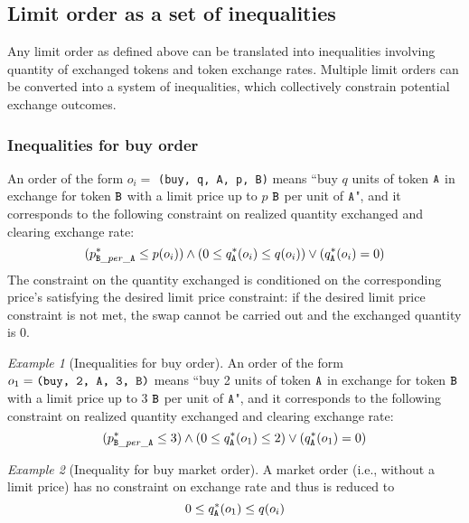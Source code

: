 \documentclass[11pt, reqno]{amsart}
\theoremstyle{definition}
\theoremstyle{remark}
\newtheorem{exmp}{Example}[subsection]
\newcommand{\tA}{\textnormal{\texttt{A}}}
\newcommand{\tB}{\textnormal{\texttt{B}}}
\newcommand{\buy}{\textnormal{\texttt{buy}}}
\begin{document}
\subsection{Limit order as a set of inequalities}
Any limit order as defined above can be translated into inequalities involving
quantity of exchanged tokens and token exchange rates. Multiple limit orders
can be converted into a system of inequalities, which collectively constrain
potential exchange outcomes.

\subsubsection{Inequalities for buy order}
An order of the form $o_i =$ \texttt{(\buy, q, \tA, p, \tB)} means
``buy $q$ units of token $\tA$ in exchange for token $\tB$ with a limit price
up to $p$ $\tB$ per unit of $\tA$",
and it corresponds to the following constraint on realized quantity exchanged
and clearing exchange rate:
\begin{equation*}
	(p_{\tB\_per\_\tA}^* \leq p(o_i)) \land
	(0 \le q_\tA^*(o_i) \leq q(o_i)) \lor
	(q_\tA^*(o_i) = 0)
\end{equation*}
The constraint on the quantity exchanged is conditioned on the corresponding
price's satisfying the desired limit price constraint: if the desired limit price
constraint is not met, the swap cannot be carried out and the exchanged quantity
is 0.

\begin{exmp}[Inequalities for buy order]
An order of the form $o_1 = \texttt{(\buy, 2, \tA, 3, \tB)}$ means
``buy 2 units of token $\tA$ in exchange for token $\tB$ with a limit price up
to 3 $\tB$ per unit of $\tA$",
and it corresponds to the following constraint on realized quantity exchanged
and clearing exchange rate:
\begin{equation*}
    (p_{\tB\_per\_\tA}^* \leq 3) \land
    (0 \le q_\tA^*(o_1) \leq 2) \lor
    (q_\tA^*(o_1) = 0)
\end{equation*}
\end{exmp}

\begin{exmp}[Inequality for buy market order]
A market order (i.e., without a limit price) has no constraint on exchange rate
and thus is reduced to
\[
    0 \le q_\tA^*(o_1) \le q(o_i)
\]
\end{exmp}
\end{document}
